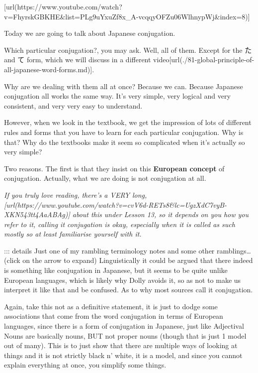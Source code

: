\startsectionlevel[title={{\bf 7.5. Conjugation}},reference={conjugation}]

[url(https://www.youtube.com/watch?v=FhyrskGBKHE&list=PLg9uYxuZf8x_A-vcqqyOFZu06WlhnypWj&index=8)]

Today we are going to talk about Japanese conjugation.

Which particular conjugation?, you may ask. Well, all of them. Except for the た and て form, which we will discuss in a different video\goto{{[}81{]}}[url(./81-global-principle-of-all-japanese-word-forms.md)].

Why are we dealing with them all at once? Because we can. Because Japanese conjugation all works the same way. It's very simple, very logical and very consistent, and very very easy to understand.

However, when we look in the textbook, we get the impression of lots of different rules and forms that you have to learn for each particular conjugation. Why is that? Why do the textbooks make it seem so complicated when it's actually so very simple?

Two reasons. The first is that they insist on this {\bf European concept} of conjugation. Actually, what we are doing is not conjugation at all.

{\em If you truly love reading, there's a VERY long, [url(https://www.youtube.com/watch?v=cvV6d-RETs8&lc=UgzXdC7vyB-XKN543tt4AaABAg)] about this under Lesson 13, so it depends on you how you refer to it, calling it conjugation is okay, especially when it is called as such mostly so at least familiarise yourself with it.}

::: details Just one of my rambling terminology notes and some other ramblings\ldots{} (click on the arrow to expand) Linguistically it could be argued that there indeed is something like conjugation in Japanese, but it seems to be quite unlike European languages, which is likely why Dolly avoids it, so as not to make us interpret it like that and be confused. As to why most sources call it conjugation.

Again, take this not as a definitive statement, it is just to dodge some associations that come from the word conjugation in terms of European languages, since there is a form of conjugation in Japanese, just like Adjectival Nouns are basically nouns, BUT not proper nouns (though that is just 1 model out of many).\crlf
This is to just show that there are multiple ways of looking at things and it is not strictly black n' white, it is a model, and since you cannot explain everything at once, you simplify some things.

